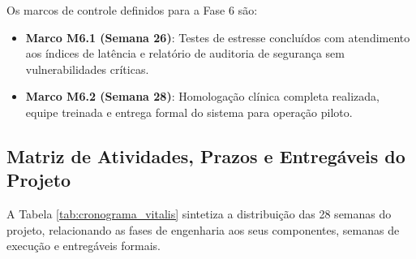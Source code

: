 Os marcos de controle definidos para a Fase 6 são:
\begin{itemize}[leftmargin=*]
    \item \textbf{Marco M6.1 (Semana 26)}: Testes de estresse concluídos com atendimento aos índices de latência e relatório de auditoria de segurança sem vulnerabilidades críticas.
    \item \textbf{Marco M6.2 (Semana 28)}: Homologação clínica completa realizada, equipe treinada e entrega formal do sistema para operação piloto.
\end{itemize}

\subsection{Matriz de Atividades, Prazos e Entregáveis do Projeto}

A Tabela \ref{tab:cronograma_vitalis} sintetiza a distribuição das 28 semanas do projeto, relacionando as fases de engenharia aos seus componentes, semanas de execução e entregáveis formais.


